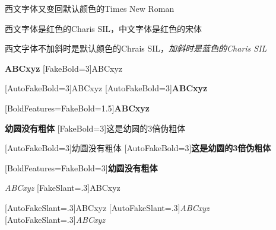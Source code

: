 \documentclass{article}
\begin{document}
\setmonofont{Times New Roman}
{\ttfamily 西文字体又变回默认颜色的Times New Roman}

{
西文字体是红色的Charis SIL，中文字体是红色的宋体
}

{
西文字体不加斜时是默认颜色的Chrais SIL，\itshape 加斜时是蓝色的Charis SIL
}

\hrulefill

{\bfseries ABCxyz}
{[FakeBold=3]ABCxyz}

{[AutoFakeBold=3]ABCxyz}
{[AutoFakeBold=3]\bfseries ABCxyz}

{[BoldFeatures={FakeBold=1.5}]\bfseries ABCxyz}

{\bfseries 幼圆没有粗体}
{[FakeBold=3]这是幼圆的3倍伪粗体}

{[AutoFakeBold=3]幼圆没有粗体}
{[AutoFakeBold=3]\bfseries 这是幼圆的3倍伪粗体}

{[BoldFeatures={FakeBold=3}]\bfseries 幼圆没有粗体}

\dotfill

{\slshape ABCxyz}
{[FakeSlant=.3]ABCxyz}

{[AutoFakeSlant=.3]ABCxyz}
{[AutoFakeSlant=.3]\slshape ABCxyz}
{[AutoFakeSlant=.3]\itshape ABCxyz}
\end{document}
